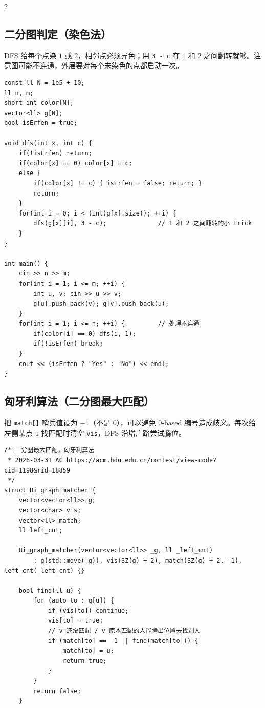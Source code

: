 \begin{multicols*}{2}
		\subsection{二分图判定（染色法）}

		DFS 给每个点染 $1$ 或 $2$，相邻点必须异色；用 \texttt{3 - c} 在 $1$ 和 $2$ 之间翻转就够。注意图可能不连通，外层要对每个未染色的点都启动一次。

		\begin{verbatim}
const ll N = 1e5 + 10;
ll n, m;
short int color[N];
vector<ll> g[N];
bool isErfen = true;

void dfs(int x, int c) {
    if(!isErfen) return;
    if(color[x] == 0) color[x] = c;
    else {
        if(color[x] != c) { isErfen = false; return; }
        return;
    }
    for(int i = 0; i < (int)g[x].size(); ++i) {
        dfs(g[x][i], 3 - c);              // 1 和 2 之间翻转的小 trick
    }
}

int main() {
    cin >> n >> m;
    for(int i = 1; i <= m; ++i) {
        int u, v; cin >> u >> v;
        g[u].push_back(v); g[v].push_back(u);
    }
    for(int i = 1; i <= n; ++i) {         // 处理不连通
        if(color[i] == 0) dfs(i, 1);
        if(!isErfen) break;
    }
    cout << (isErfen ? "Yes" : "No") << endl;
}
		\end{verbatim}


		\subsection{匈牙利算法（二分图最大匹配）}

		把 \texttt{match[]} 哨兵值设为 $-1$（不是 $0$），可以避免 0-based 编号造成歧义。每次给左侧某点 \texttt{u} 找匹配时清空 \texttt{vis}，DFS 沿增广路尝试腾位。

		\begin{verbatim}
/* 二分图最大匹配，匈牙利算法
 * 2026-03-31 AC https://acm.hdu.edu.cn/contest/view-code?cid=1198&rid=18859
 */
struct Bi_graph_matcher {
    vector<vector<ll>> g;
    vector<char> vis;
    vector<ll> match;
    ll left_cnt;

    Bi_graph_matcher(vector<vector<ll>> _g, ll _left_cnt)
        : g(std::move(_g)), vis(SZ(g) + 2), match(SZ(g) + 2, -1), left_cnt(_left_cnt) {}

    bool find(ll u) {
        for (auto to : g[u]) {
            if (vis[to]) continue;
            vis[to] = true;
            // v 还没匹配 / v 原本匹配的人能腾出位置去找别人
            if (match[to] == -1 || find(match[to])) {
                match[to] = u;
                return true;
            }
        }
        return false;
    }


\end{verbatim}
\end{multicols*}
